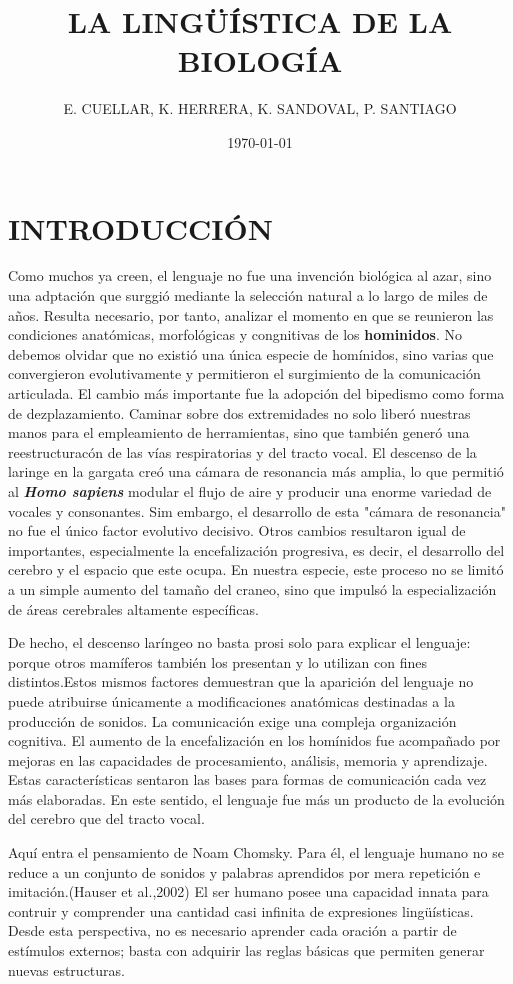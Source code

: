 \documentclass[12pt]{article}
\title{LA LINGÜÍSTICA DE LA BIOLOGÍA}
\author{E. CUELLAR, K. HERRERA, K. SANDOVAL, P. SANTIAGO}
\date{\today}
\begin{document}
\maketitle

\section{INTRODUCCIÓN}
Como muchos ya creen, el lenguaje no fue una invención biológica al azar, sino una adptación que surggió mediante la selección natural a lo largo de miles de años. Resulta necesario, por tanto, analizar el momento en que se reunieron las condiciones anatómicas, morfológicas y congnitivas de los \textbf{hominidos}. No debemos olvidar que no existió una única especie de homínidos, sino varias que convergieron evolutivamente y permitieron el surgimiento de la comunicación articulada.
El cambio más importante fue la adopción del bipedismo como forma de dezplazamiento. Caminar sobre dos extremidades no solo liberó nuestras manos para el empleamiento de herramientas, sino que también generó una reestructuracón de las vías respiratorias y del tracto vocal. El descenso de la laringe en la gargata creó una cámara de resonancia más amplia, lo que permitió al \textbf{\textit{Homo sapiens}} modular el flujo de aire y producir una enorme variedad de vocales y consonantes.
Sim embargo, el desarrollo de esta "cámara de resonancia" no fue el único factor evolutivo decisivo. Otros cambios resultaron igual de importantes, especialmente la encefalización progresiva, es decir, el desarrollo del cerebro y el espacio que este ocupa. En nuestra especie, este proceso no se limitó a un simple aumento del tamaño del craneo, sino que impulsó la especialización de áreas cerebrales altamente específicas. 

De hecho, el descenso laríngeo no basta prosi solo para explicar el lenguaje: porque otros mamíferos también los presentan y lo utilizan con fines distintos.Estos mismos factores demuestran que la aparición del lenguaje no puede atribuirse únicamente a modificaciones anatómicas destinadas a la producción de sonidos. La comunicación exige una compleja organización cognitiva. El aumento de la encefalización en los homínidos fue acompañado por mejoras en las capacidades de procesamiento, análisis, memoria y aprendizaje. Estas características sentaron las bases para formas de comunicación cada vez más elaboradas. En este sentido, el lenguaje fue más un producto de la evolución del cerebro que del tracto vocal. 

Aquí entra el pensamiento de Noam Chomsky. Para él, el lenguaje humano no se reduce a un conjunto de sonidos y palabras aprendidos por mera repetición e imitación.(Hauser et al.,2002) El ser humano posee una capacidad innata para contruir y comprender una cantidad casi infinita de expresiones lingüísticas. Desde esta perspectiva, no es necesario aprender cada oración a partir de estímulos externos; basta con adquirir las reglas básicas que permiten generar nuevas estructuras. 
\end{document}
